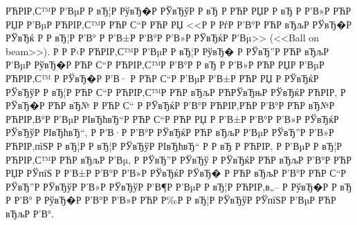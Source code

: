 \documentclass[a4paper,14pt]{extarticle}
\begin{document}
РЋРІР‚С™Р  Р’ВµР  Р вЂ¦Р  РўвЂ�Р  РЎвЂўР  Р вЂ  Р РЋР РЏР  Р вЂ Р  Р’В»Р РЋР РЏР  Р’ВµР РЋРІР‚С™Р РЋР С“Р РЋР РЏ <<Р  Р РѓР  Р’В°Р РЋР вЂљР  РЎвЂ�Р  РЎвЂќ Р  Р вЂ¦Р  Р’В° Р  Р’В±Р  Р’В°Р  Р’В»Р  РЎвЂќР  Р’Вµ>> (<<Ball on beam>>). Р  Р Р‹Р РЋРІР‚С™Р  Р’ВµР  Р вЂ¦Р  РўвЂ� Р  РЎвЂ”Р РЋР вЂљР  Р’ВµР  РўвЂ�Р РЋР С“Р РЋРІР‚С™Р  Р’В°Р  Р вЂ Р  Р’В»Р РЋР РЏР  Р’ВµР РЋРІР‚С™ Р  РЎвЂ�Р  Р’В· Р РЋР С“Р  Р’ВµР  Р’В±Р РЋР РЏ Р  РЎвЂќР  РЎвЂўР  Р вЂ¦Р РЋР С“Р РЋРІР‚С™Р РЋР вЂљР РЋРЎвЂњР  РЎвЂќР РЋРІР‚ Р  РЎвЂ�Р РЋР вЂ№ Р РЋР С“ Р  РЎвЂќР  Р’В°Р РЋРІР‚РЋР  Р’В°Р РЋР вЂ№Р РЋРІР‚В°Р  Р’ВµР  РІвЂћвЂ“Р РЋР С“Р РЋР РЏ Р  Р’В±Р  Р’В°Р  Р’В»Р  РЎвЂќР  РЎвЂўР  РІвЂћвЂ“, Р  Р’В·Р  Р’В°Р  РЎвЂќР РЋР вЂљР  Р’ВµР  РЎвЂ”Р  Р’В»Р РЋРІР‚пїЅР  Р вЂ¦Р  Р вЂ¦Р  РЎвЂўР  РІвЂћвЂ“ Р  Р вЂ  Р РЋРІР‚ Р  Р’ВµР  Р вЂ¦Р РЋРІР‚С™Р РЋР вЂљР  Р’Вµ, Р  РЎвЂ”Р  РЎвЂў Р  РЎвЂќР РЋР вЂљР  Р’В°Р РЋР РЏР  РЎпїЅ Р  Р’В±Р  Р’В°Р  Р’В»Р  РЎвЂќР  РЎвЂ� Р РЋР вЂљР  Р’В°Р РЋР С“Р  РЎвЂ”Р  РЎвЂўР  Р’В»Р  РЎвЂўР  Р’В¶Р  Р’ВµР  Р вЂ¦Р РЋРІР‚в„– Р  РўвЂ�Р  Р вЂ Р  Р’В° Р  РўвЂ�Р  Р’В°Р  Р’В»Р РЋР Р‰Р  Р вЂ¦Р  РЎвЂўР  РЎпїЅР  Р’ВµР РЋР вЂљР  Р’В°.
\end{document}
